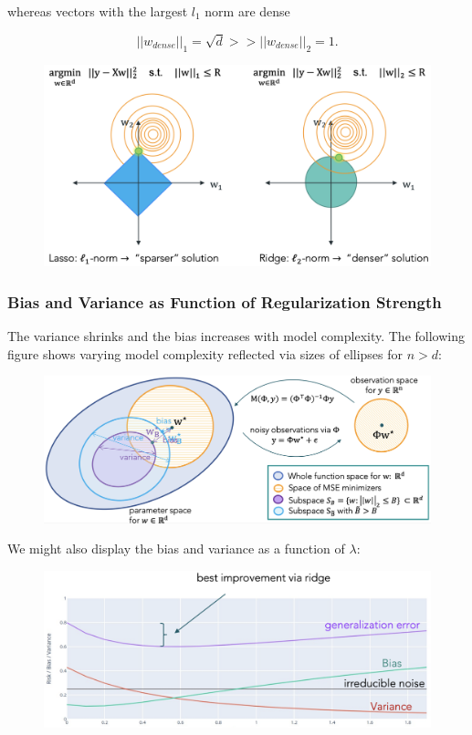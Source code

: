 \documentclass[a4paper]{extarticle}
\begin{document}
whereas vectors with the largest \(l_1\) norm are dense

\[
    ||w_{dense}||_1 = \sqrt{d} >> ||w_{dense}||_2 = 1.
\]

\begin{figure}[H]
    \includegraphics[width=15cm]{../images/IntroML_Fig3-21}
    \centering
\end{figure}

\subsubsection{Bias and Variance as Function of Regularization Strength}

The variance shrinks and the bias increases with model complexity. The following figure shows varying model complexity reflected via sizes of ellipses for \(n > d\):

\begin{figure}[H]
    \includegraphics[width=15cm]{../images/IntroML_Fig3-22}
    \centering
\end{figure}

We might also display the bias and variance as a function of \(\lambda\):

\begin{figure}[H]
    \includegraphics[width=15cm]{../images/IntroML_Fig3-23}
    \centering
\end{figure}
\end{document}
